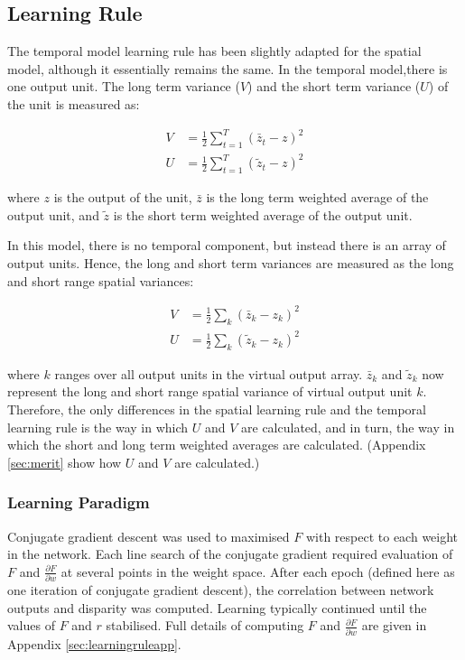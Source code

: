 \documentclass[a4paper]{article}
\newcommand{\zbar}{\bar{z}}
\newcommand{\ztilde}{\tilde{z}}
\newcommand{\pdiff}[2]{ \frac{\partial #1}{\partial #2}}
\begin{document}
\subsection{Learning Rule}


The temporal model learning rule has been slightly adapted for the
spatial model, although it essentially remains the same.  In the
temporal model,there is one output unit.  The long term variance ($V$)
and the short term variance ($U$) of the unit is measured as:
        
\begin{align*}
  V &= \frac{1}{2} \sum_{t=1}^{T} ( \zbar_t - z)^2 \\
  U &= \frac{1}{2} \sum_{t=1}^{T} ( \ztilde_t - z)^2
\end{align*}

where $z$ is the output of the unit, $\zbar$ is the long term weighted
average of the output unit, and $\ztilde$ is the short term weighted
average of the output unit.

In this model, there is no temporal component, but instead there is an
array of output units.  Hence, the long and short  term variances are
measured as the long and short range spatial variances:

\begin{align*}
V & = \frac{1}{2} \sum_k ( \zbar_k - z_k ) ^2 \\
U & = \frac{1}{2} \sum_k ( \ztilde_k - z_k ) ^2 
\end{align*}

where $k$ ranges over all output units in the virtual output array.
$\zbar_k$ and $\ztilde_k$ now represent the long and short range
spatial variance of virtual output unit $k$.  Therefore, the only
differences in the spatial learning rule and the temporal learning
rule is the way in which $U$ and $V$ are calculated, and in turn, the
way in which the short and long term weighted averages are calculated.
(Appendix \ref{sec:merit} show how $U$ and $V$ are calculated.)

\subsubsection{Learning Paradigm}

Conjugate gradient descent \cite{williams91} was used to maximised $F$
with respect to each weight in the network.  Each line search of the
conjugate gradient required evaluation of $F$ and $\pdiff{F}{w}$
at several points in the weight space.  After each epoch
(defined here as one iteration of conjugate gradient descent), the
correlation between network outputs and disparity was computed.
Learning typically continued until the values of $F$ and $r$
stabilised.  Full details of computing $F$ and $\pdiff{F}{w}$ are
given in  Appendix \ref{sec:learningruleapp}.
\end{document}
